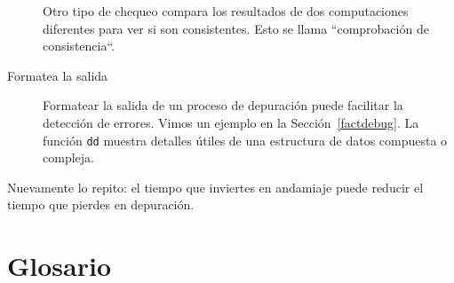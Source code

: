 \begin{description}
Otro tipo de chequeo compara los resultados de dos computaciones
diferentes para ver si son consistentes. Esto se llama
``comprobación de consistencia``.

\item[Formatea la salida] Formatear la salida de un proceso de
depuración puede facilitar la detección de errores. Vimos un ejemplo
en la Sección~\ref{factdebug}. La función {\tt dd} muestra detalles
útiles de una estructura de datos compuesta o compleja.


\end{description}

Nuevamente lo repito: el tiempo que inviertes en andamiaje puede 
reducir el tiempo que pierdes en depuración.


\section{Glosario}

